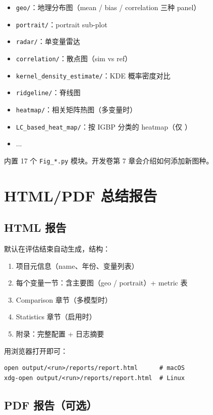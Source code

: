 \begin{itemize}
  \item \texttt{geo/}：地理分布图（mean / bias / correlation 三种 panel）
  \item \texttt{portrait/}：portrait sub-plot
  \item \texttt{radar/}：单变量雷达
  \item \texttt{correlation/}：散点图（sim vs ref）
  \item \texttt{kernel\_density\_estimate/}：KDE 概率密度对比
  \item \texttt{ridgeline/}：脊线图
  \item \texttt{heatmap/}：相关矩阵热图（多变量时）
  \item \texttt{LC\_based\_heat\_map/}：按 IGBP 分类的 heatmap（仅 ）
  \item ...
\end{itemize}

\openbench{} 内置 17 个 \texttt{Fig\_*.py} 模块。开发卷第 7 章会介绍如何添加新图种。

\section{HTML/PDF 总结报告}

\subsection{HTML 报告}

 默认在评估结束自动生成，结构：

\begin{enumerate}
  \item 项目元信息（name、年份、变量列表）
  \item 每个变量一节：含主要图（geo / portrait）+ metric 表
  \item Comparison 章节（多模型时）
  \item Statistics 章节（启用时）
  \item 附录：完整配置 + 日志摘要
\end{enumerate}

用浏览器打开即可：

\begin{verbatim}
open output/<run>/reports/report.html      # macOS
xdg-open output/<run>/reports/report.html  # Linux
\end{verbatim}

\subsection{PDF 报告（可选）}

